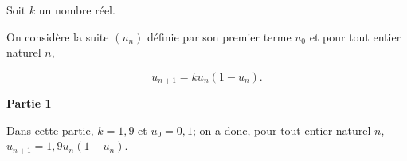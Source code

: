 
\medskip

Soit $k$ un nombre réel.

On considère la suite $\left(u_n\right)$ définie par son premier terme $u_0$ et pour tout entier naturel $n$,

\[u_{n+1} = ku_n\left(1- u_n\right).\]



\bigskip

\textbf{Partie 1}

\medskip

Dans cette partie, $k = 1,9$ et $u_0 = 0,1$; on a donc,  pour tout entier naturel $n$,\: $u_{n+1} = 1,9u_n\left(1 - u_n\right)$.


